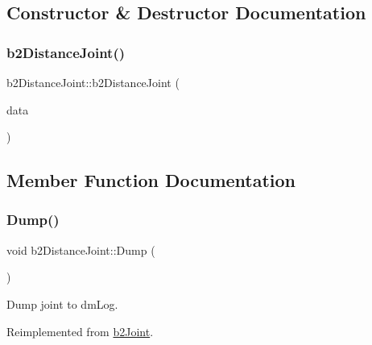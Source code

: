 \subsection{Constructor \& Destructor Documentation}
\mbox{\label{classb2_distance_joint_ad2bb6de92a47868629a7397e23256454}} 
\subsubsection{\texorpdfstring{b2DistanceJoint()}{b2DistanceJoint()}}
{\footnotesize\ttfamily b2\+Distance\+Joint\+::b2\+Distance\+Joint (\begin{DoxyParamCaption}\item[{const \mbox{\hyperlink{structb2_distance_joint_def}{b2\+Distance\+Joint\+Def}} $\ast$}]{data }\end{DoxyParamCaption})\hspace{0.3cm}{\ttfamily [protected]}}



\subsection{Member Function Documentation}
\mbox{\label{classb2_distance_joint_a3cebcc6ccce6f3c24432cd130fd53517}} 
\subsubsection{\texorpdfstring{Dump()}{Dump()}}
{\footnotesize\ttfamily void b2\+Distance\+Joint\+::\+Dump (\begin{DoxyParamCaption}{ }\end{DoxyParamCaption})\hspace{0.3cm}{\ttfamily [virtual]}}



Dump joint to dm\+Log. 



Reimplemented from \mbox{\hyperlink{classb2_joint_abd35e7316017ad9a40d5dbf9b5ba3f36}{b2\+Joint}}.

\mbox{\label{classb2_distance_joint_ae228d3ce27009acd8a20c2570fb1183c}} 
